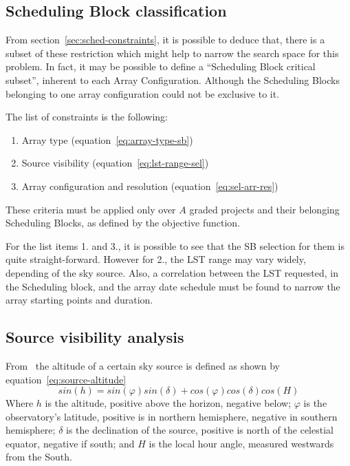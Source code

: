\subsection{Scheduling Block classification}
\label{sec:array-sb-classification}
From section~\ref{sec:sched-constraints}, it is possible to deduce that, there is a subset of these restriction which might help to narrow the search space for this problem. In fact, it may be possible to define a ``Scheduling Block critical subset'', inherent to each Array Configuration. Although the Scheduling Blocks belonging to one array configuration could not be exclusive to it.

The list of constraints is the following:
\begin{enumerate}
\item Array type (equation~\ref{eq:array-type-sb})
\item Source visibility (equation~\ref{eq:lst-range-sel})
\item Array configuration and resolution (equation~\ref{eq:sel-arr-res})
\end{enumerate}
These criteria must be applied only over $A$ graded projects and their belonging Scheduling Blocks, as defined by the objective function.

For the list items 1. and 3., it is possible to see that the SB selection for them is quite straight-forward. However for 2., the LST range may vary widely, depending of the sky source. Also, a correlation between the LST requested, in the Scheduling block, and the array date schedule must be found to narrow the array starting points and duration.

\subsection{Source visibility analysis}
From~\cite{meeus98} the altitude of a certain sky source is defined as shown by equation~\ref{eq:source-altitude}
\begin{equation}
\label{eq:source-altitude}
sin(h) = sin(\varphi) sin(\delta) + cos(\varphi) cos(\delta) cos(H)
\end{equation}
Where $h$ is the altitude, positive above the horizon, negative below; $\varphi$ is the observatory's latitude, positive is in northern hemisphere, negative in southern hemisphere; $\delta$ is the declination of the source, positive is north of the celestial equator, negative if south; and $H$ is the local hour angle, measured westwards from the South.

